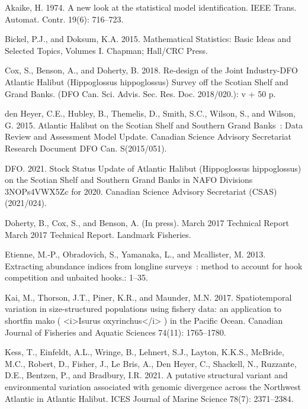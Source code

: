 \documentclass[12pt]{article}\usepackage[]{graphicx}\usepackage[]{color}
\begin{document}
\noindent \vspace{-2em} \setlength{\parindent}{-0.2in} \setlength{\leftskip}{0.2in} \setlength{\parskip}{8pt}

\hypertarget{refs}{}
\leavevmode\hypertarget{ref-Akaike1974}{}%
Akaike, H. 1974. A new look at the statistical model identification. IEEE Trans. Automat. Contr. 19(6): 716--723.

\leavevmode\hypertarget{ref-Bickel2015}{}%
Bickel, P.J., and Doksum, K.A. 2015. Mathematical Statistics: Basic Ideas and Selected Topics, Volumes I. Chapman; Hall/CRC Press.

\leavevmode\hypertarget{ref-Cox2018}{}%
Cox, S., Benson, A., and Doherty, B. 2018. Re-design of the Joint Industry-DFO Atlantic Halibut (Hippoglossus hippoglossus) Survey off the Scotian Shelf and Grand Banks. (DFO Can. Sci. Advis. Sec. Res. Doc. 2018/020.): v + 50 p.

\leavevmode\hypertarget{ref-DenHeyer2015}{}%
den Heyer, C.E., Hubley, B., Themelis, D., Smith, S.C., Wilson, S., and Wilson, G. 2015. Atlantic Halibut on the Scotian Shelf and Southern Grand Banks~: Data Review and Assessment Model Update. Canadian Science Advisory Secretariat Research Document DFO Can. S(2015/051).

\leavevmode\hypertarget{ref-DFO2021}{}%
DFO. 2021. Stock Status Update of Atlantic Halibut (Hippoglossus hippoglossus) on the Scotian Shelf and Southern Grand Banks in NAFO Divisions 3NOPs4VWX5Zc for 2020. Canadian Science Advisory Secretariat (CSAS) (2021/024).

\leavevmode\hypertarget{ref-Doherty2017}{}%
Doherty, B., Cox, S., and Benson, A. (In press). March 2017 Technical Report March 2017 Technical Report. Landmark Fisheries.

\leavevmode\hypertarget{ref-Etienne2013}{}%
Etienne, M.-P., Obradovich, S., Yamanaka, L., and Mcallister, M. 2013. Extracting abundance indices from longline surveys~: method to account for hook competition and unbaited hooks.: 1--35.

\leavevmode\hypertarget{ref-Kai2017}{}%
Kai, M., Thorson, J.T., Piner, K.R., and Maunder, M.N. 2017. Spatiotemporal variation in size-structured populations using fishery data: an application to shortfin mako ( \textless i\textgreater Isurus oxyrinchus\textless/i\textgreater{} ) in the Pacific Ocean. Canadian Journal of Fisheries and Aquatic Sciences 74(11): 1765--1780.

\leavevmode\hypertarget{ref-Kess2021}{}%
Kess, T., Einfeldt, A.L., Wringe, B., Lehnert, S.J., Layton, K.K.S., McBride, M.C., Robert, D., Fisher, J., Le Bris, A., Den Heyer, C., Shackell, N., Ruzzante, D.E., Bentzen, P., and Bradbury, I.R. 2021. A putative structural variant and environmental variation associated with genomic divergence across the Northwest Atlantic in Atlantic Halibut. ICES Journal of Marine Science 78(7): 2371--2384.
\end{document}
